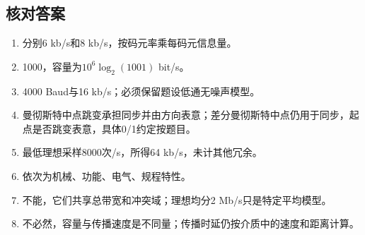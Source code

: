 \subsection{核对答案}\label{CN02-review-answers}

\begin{enumerate}
\def\labelenumi{\arabic{enumi}.}
\tightlist
\item
  分别6 kb/s和8 kb/s，按码元率乘每码元信息量。
\item
  1000，容量为\(10^6\log_2(1001)\) bit/s。
\item
  4000 Baud与16 kb/s；必须保留题设低通无噪声模型。
\item
  曼彻斯特中点跳变承担同步并由方向表意；差分曼彻斯特中点仍用于同步，起点是否跳变表意，具体0/1约定按题目。
\item
  最低理想采样8000次/s，所得64 kb/s，未计其他冗余。
\item
  依次为机械、功能、电气、规程特性。
\item
  不能，它们共享总带宽和冲突域；理想均分2 Mb/s只是特定平均模型。
\item
  不必然，容量与传播速度是不同量；传播时延仍按介质中的速度和距离计算。
\end{enumerate}
